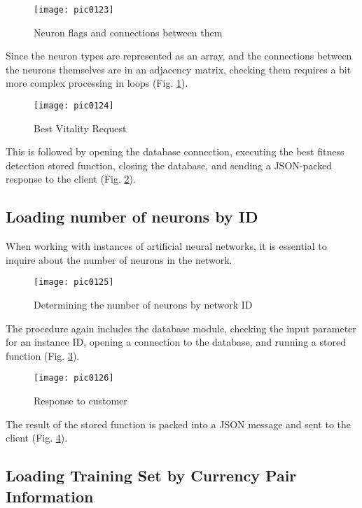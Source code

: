\begin{figure}[h]
\centering
\texttt{[image: pic0123]}
\caption{Neuron flags and connections between them}
\label{fig:pic0123}
\end{figure}
\FloatBarrier

Since the neuron types are represented as an array, and the connections between the neurons themselves are in an adjacency matrix, checking them requires a bit more complex processing in loops (Fig. \ref{fig:pic0123}).

\begin{figure}[h]
\centering
\texttt{[image: pic0124]}
\caption{Best Vitality Request}
\label{fig:pic0124}
\end{figure}
\FloatBarrier

This is followed by opening the database connection, executing the best fitness detection stored function, closing the database, and sending a JSON-packed response to the client (Fig. \ref{fig:pic0124}).

\subsection{Loading number of neurons by ID}

When working with instances of artificial neural networks, it is essential to inquire about the number of neurons in the network.

\begin{figure}[h]
\centering
\texttt{[image: pic0125]}
\caption{Determining the number of neurons by network ID}
\label{fig:pic0125}
\end{figure}
\FloatBarrier

The procedure again includes the database module, checking the input parameter for an instance ID, opening a connection to the database, and running a stored function (Fig. \ref{fig:pic0125}).

\begin{figure}[h]
\centering
\texttt{[image: pic0126]}
\caption{Response to customer}
\label{fig:pic0126}
\end{figure}
\FloatBarrier

The result of the stored function is packed into a JSON message and sent to the client (Fig. \ref{fig:pic0126}).

\subsection{Loading Training Set by Currency Pair Information}

